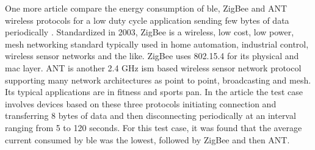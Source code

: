 One more article compare the energy consumption of \gls{ble}, ZigBee and ANT wireless protocols for a low duty cycle application sending few bytes of data periodically  \cite{Dementyev2013}. Standardized in 2003, ZigBee is a wireless, low cost, low power, mesh networking standard \cite{ZigbeeAkl} typically used in home automation, industrial control, wireless sensor networks and the like. ZigBee uses 802.15.4 for its physical and \gls{mac} layer. ANT is another 2.4 GHz \gls{ism} based wireless sensor network protocol supporting many network architectures as point to point, broadcasting and mesh. Its typical applications are in fitness and sports \gls{pan}. In the article \cite{Dementyev2013} the test case involves devices based on these three protocols initiating connection and transferring 8 bytes of data and then disconnecting periodically at an interval ranging from 5 to 120 seconds. For this test case, it was found that the average current consumed by \gls{ble} was the lowest, followed by ZigBee and then ANT. 

